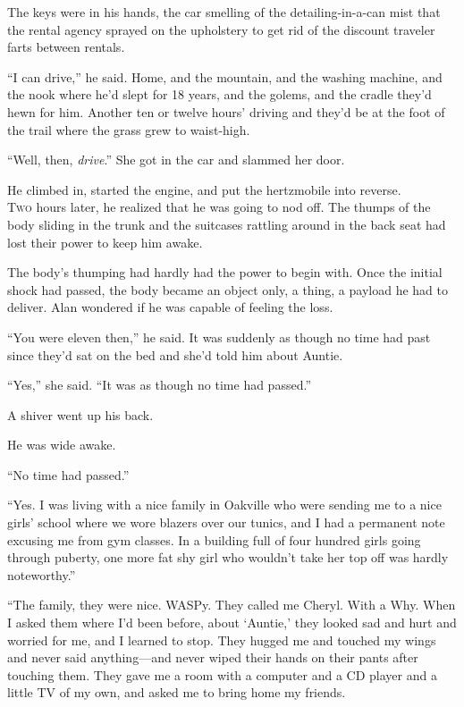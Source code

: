 The keys were in his hands, the car smelling of the detailing-in-a-can
mist that the rental agency sprayed on the upholstery to get rid of
the discount traveler farts between rentals.

``I can drive,'' he said.  Home, and the mountain, and the washing
machine, and the nook where he'd slept for 18 years, and the golems,
and the cradle they'd hewn for him.  Another ten or twelve hours'
driving and they'd be at the foot of the trail where the grass grew to
waist-high.

``Well, then, \textit{drive}.'' She got in the car and slammed her
door.

He climbed in, started the engine, and put the hertzmobile into
reverse.
\\
\lettrine[lines=3, lhang=.5, nindent=0pt, findent=2pt]{T}{wo} hours later, he realized that he was going to nod off.  The thumps
of the body sliding in the trunk and the suitcases rattling around in
the back seat had lost their power to keep him awake.

The body's thumping had hardly had the power to begin with.  Once the
initial shock had passed, the body became an object only, a thing, a
payload he had to deliver.  Alan wondered if he was capable of feeling
the loss.

``You were eleven then,'' he said.  It was suddenly as though no time
had past since they'd sat on the bed and she'd told him about Auntie.

``Yes,'' she said.  ``It was as though no time had passed.''

A shiver went up his back.

He was wide awake.

``No time had passed.''

``Yes.  I was living with a nice family in Oakville who were sending
me to a nice girls' school where we wore blazers over our tunics, and
I had a permanent note excusing me from gym classes.  In a building
full of four hundred girls going through puberty, one more fat shy
girl who wouldn't take her top off was hardly noteworthy.''

``The family, they were nice.  WASPy.  They called me Cheryl.  With a
Why.  When I asked them where I'd been before, about `Auntie,' they
looked sad and hurt and worried for me, and I learned to stop.  They
hugged me and touched my wings and never said anything---and never
wiped their hands on their pants after touching them.  They gave me a
room with a computer and a CD player and a little TV of my own, and
asked me to bring home my friends.

